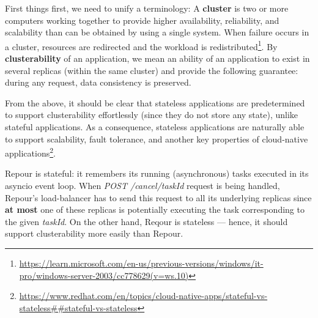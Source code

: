 \documentclass[../main.tex]{subfiles}
\begin{document}
First things first, we need to unify a terminology: A \textbf{cluster} is two or more computers working together to provide higher availability, reliability, and scalability than can be obtained by using a single system. When failure occurs in a cluster, resources are redirected and the workload is redistributed\footnote{\url{https://learn.microsoft.com/en-us/previous-versions/windows/it-pro/windows-server-2003/cc778629(v=ws.10)}}. By \textbf{clusterability} of an application, we mean an ability of an application to exist in several replicas (within the same cluster) and provide the following guarantee: during any request, data consistency is preserved.

From the above, it should be clear that stateless applications are predetermined to support clusterability effortlessly (since they do not store any state), unlike stateful applications. As a consequence, stateless applications are naturally able to support scalability, fault tolerance, and another key properties of cloud-native applications\footnote{\url{https://www.redhat.com/en/topics/cloud-native-apps/stateful-vs-stateless##stateful-vs-stateless}}.

Repour is stateful: it remembers its running (asynchronous) tasks executed in its asyncio event loop. When \textit{POST /cancel/{taskId}} request is being handled, Repour's load-balancer has to send this request to all its underlying replicas since \textbf{at most} one of these replicas is potentially executing the task corresponding to the given \textit{taskId}. On the other hand, Reqour is stateless — hence, it should support clusterability more easily than Repour.
\end{document}

